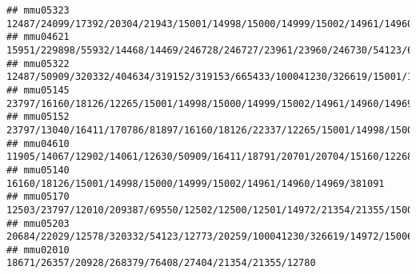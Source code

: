 \documentclass[
]{article}
\begin{document}
\begin{verbatim}
## mmu05323                                                                                                                                                                            12487/24099/17392/20304/21943/15001/14998/15000/14999/15002/14961/14960/14969/381091/16994
## mmu04621                                                                                           15951/229898/55932/14468/14469/246728/246727/23961/23960/246730/54123/66298/634825/382059/100041759/13237/13239/100041890/626682/626708/100041952/503491/637515/20304/54483
## mmu05322                                                                                                                                    12487/50909/320332/404634/319152/319153/665433/100041230/326619/15001/14998/15000/14999/15002/14961/14960/14969/381091/12268/12263
## mmu05145                                                                                                                                                                           23797/16160/18126/12265/15001/14998/15000/14999/15002/14961/14960/14969/381091/15511/193740
## mmu05152                                                                                                                                             23797/13040/16411/170786/81897/16160/18126/22337/12265/15001/14998/15000/14999/15002/14961/14960/14969/381091/12475/16149
## mmu04610                                                                                                                                                                                         11905/14067/12902/14061/12630/50909/16411/18791/20701/20704/15160/12268/12263
## mmu05140                                                                                                                                                                                                    16160/18126/15001/14998/15000/14999/15002/14961/14960/14969/381091
## mmu05170                                                                                                                    12503/23797/12010/209387/69550/12502/12500/12501/14972/21354/21355/15006/15013/15015/110557/15018/110558/15039/100529082/15024/630294/667977/14990
## mmu05203                                                                                                                     20684/22029/12578/320332/54123/12773/20259/100041230/326619/14972/15006/15013/15015/110557/15018/110558/15039/100529082/15024/630294/667977/14990
## mmu02010                                                                                                                                                                                                                18671/26357/20928/268379/76408/27404/21354/21355/12780

\end{verbatim}
\end{document}
